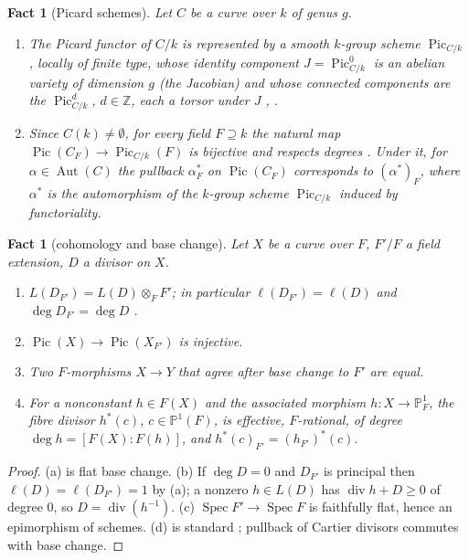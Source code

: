 \documentclass[11pt]{amsart}
\newtheorem{fact}[theorem]{Fact}
\theoremstyle{definition}
\theoremstyle{remark}
\newcommand{\Z}{\mathbb Z}
\newcommand{\PP}{\mathbb P}
\newcommand{\Pic}{\operatorname{Pic}}
\newcommand{\Aut}{\operatorname{Aut}}
\newcommand{\Spec}{\operatorname{Spec}}
\newcommand{\divv}{\operatorname{div}}
\begin{document}
\begin{fact}[Picard schemes]\label{fact:pic}
Let $C$ be a curve over $k$ of genus $g$.
\begin{enumerate}[label=\textup{(\alph*)}]
\item The Picard functor of $C/k$ is represented by a smooth $k$-group scheme
$\Pic_{C/k}$, locally of finite type, whose identity component $J=\Pic^0_{C/k}$ is an
abelian variety of dimension $g$ (the Jacobian) and whose connected components are the
$\Pic^d_{C/k}$, $d\in\Z$, each a torsor under $J$ \cite[8.2, Thm.~3; 8.4, Thm.~3]{BLR},
\cite[Thm.~9.4.8, Prop.~9.5.3, Cor.~9.5.4]{Kl}.
\item Since $C(k)\ne\emptyset$, for every field $F\supseteq k$ the natural map
$\Pic(C_F)\to\Pic_{C/k}(F)$ is bijective and respects degrees
\cite[8.1, Prop.~4]{BLR}. Under it, for $\alpha\in\Aut(C)$ the pullback $\alpha_F^*$ on
$\Pic(C_F)$ corresponds to $(\alpha^*)_F$, where $\alpha^*$ is the automorphism of the
$k$-group scheme $\Pic_{C/k}$ induced by functoriality.
\end{enumerate}
\end{fact}

\begin{fact}[cohomology and base change]\label{fact:bc}
Let $X$ be a curve over $F$, $F'/F$ a field extension, $D$ a divisor on $X$.
\begin{enumerate}[label=\textup{(\alph*)}]
\item $L(D_{F'})=L(D)\otimes_FF'$; in particular $\ell(D_{F'})=\ell(D)$ and
$\deg D_{F'}=\deg D$ \cite[III.9.3]{Ha}.
\item $\Pic(X)\to\Pic(X_{F'})$ is injective.
\item Two $F$-morphisms $X\to Y$ that agree after base change to $F'$ are equal.
\item For a nonconstant $h\in F(X)$ and the associated morphism $h\colon X\to\PP^1_F$,
the fibre divisor $h^*(c)$, $c\in\PP^1(F)$, is effective, $F$-rational, of degree
$\deg h=[F(X):F(h)]$, and $h^*(c)_{F'}=(h_{F'})^*(c)$.
\end{enumerate}
\end{fact}

\begin{proof}
(a) is flat base change. (b) If $\deg D=0$ and $D_{F'}$ is principal then
$\ell(D)=\ell(D_{F'})=1$ by (a); a nonzero $h\in L(D)$ has $\divv h+D\ge0$ of degree $0$,
so $D=\divv(h^{-1})$. (c) $\Spec F'\to\Spec F$ is faithfully flat, hence an epimorphism
of schemes. (d) is standard \cite[II.6.9, II.6.10]{Ha}; pullback of Cartier divisors
commutes with base change.
\end{proof}
\end{document}
